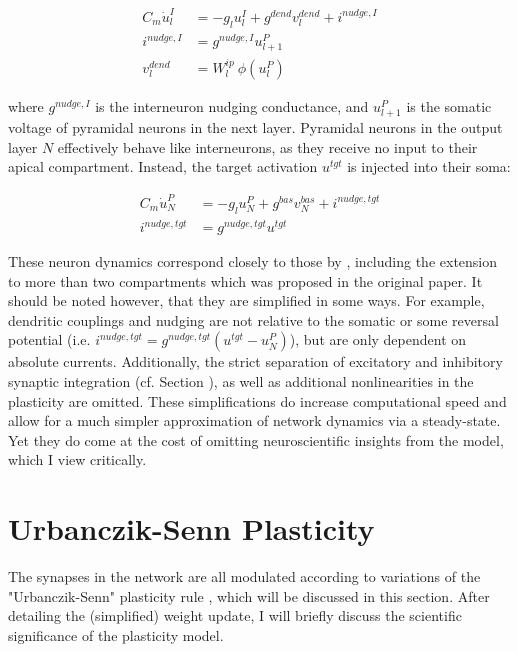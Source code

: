 \begin{align}
  C_m \dot{u}_l^I & = - g_l u_l^{I} + g^{dend} v_l^{dend} + i^{nudge, I}\label{eq-intn-dynamics} \\
  i^{nudge, I}    & = g^{nudge, I} u_{l+1}^P                                                     \\
  v_l^{dend}      & = W_l^{ip} \ \phi(u_{l}^P)
\end{align}

where $ g^{nudge, I}$ is the interneuron nudging conductance, and $u_{l+1}^P$ is the somatic voltage of pyramidal
neurons in the next layer.  Pyramidal neurons in the output layer $N$ effectively behave like interneurons, as they
receive no input to their apical compartment. Instead, the target  activation $u^{tgt}$ is injected into their soma:

\begin{align}
  C_m \dot{u}_N^P & = - g_l u_N^{P} + g^{bas} v_N^{bas} + i^{nudge, tgt} \\
  i^{nudge, tgt}  & = g^{nudge, tgt} u^{tgt}
\end{align}


These neuron dynamics correspond closely to those by \cite{urbanczik2014learning}, including the extension to more than
two compartments which was proposed in the original paper. It should be noted however, that they are simplified in some
ways. For example, dendritic couplings and nudging are not relative to the somatic or some reversal potential (i.e.
$i^{nudge, tgt}= g^{nudge, tgt} (u^{tgt} - u_N^P )$), but are only dependent on absolute currents. Additionally, the
strict separation of excitatory and inhibitory synaptic integration (cf. Section ), as well as
additional nonlinearities in the plasticity are omitted.  These simplifications do increase computational speed and
allow for a much simpler approximation of network dynamics via a steady-state. Yet they do come at the cost of omitting
neuroscientific insights from the model, which I view critically. \phrasing




\section{Urbanczik-Senn Plasticity}\label{sec-urb-senn-plast}

The synapses in the network are all modulated according to variations of the "Urbanczik-Senn" plasticity rule
\citep{urbanczik2014learning}, which will be discussed in this section. After detailing the (simplified) weight update,
I will briefly discuss the scientific significance of the plasticity model.

